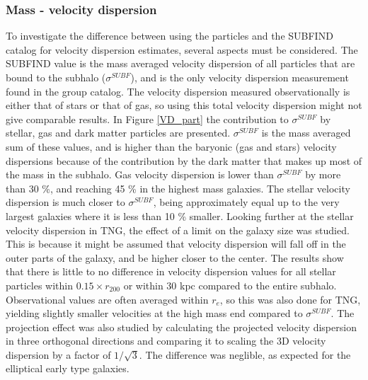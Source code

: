 \subsubsection{Mass - velocity dispersion}
To investigate the difference between using the particles and the SUBFIND catalog for velocity dispersion estimates, several aspects must be considered. The SUBFIND value is the mass averaged velocity dispersion of all particles that are bound to the subhalo ($\sigma^{SUBF}$), and is the only velocity dispersion measurement found in the group catalog. The velocity dispersion measured observationally is either that of stars or that of gas, so using this total velocity dispersion might not give comparable results. In Figure \ref{VD_part} the contribution to $\sigma^{SUBF}$ by stellar, gas and dark matter particles are presented. 
$\sigma^{SUBF}$ is the mass averaged sum of these values, and is higher than the baryonic (gas and stars) velocity dispersions because of the contribution by the dark matter that makes up most of the mass in the subhalo. Gas velocity dispersion is lower than $\sigma^{SUBF}$ by more than 30 \%, and reaching 45 \% in the highest mass galaxies. The stellar velocity dispersion is much closer to $\sigma^{SUBF}$, being approximately equal up to the very largest galaxies where it is less than 10 \% smaller. Looking further at the stellar velocity dispersion in TNG, the effect of a limit on the galaxy size was studied. This is because it might be assumed that velocity dispersion will fall off in the outer parts of the galaxy, and be higher closer to the center. The results show that there is little to no difference in velocity dispersion values for all stellar particles within $0.15 \times r_{200}$ or within 30 kpc compared to the entire subhalo. Observational values are often averaged within $r_e$, so this was also done for TNG, yielding slightly smaller velocities at the high mass end compared to $\sigma^{SUBF}$. The projection effect was also studied by calculating the projected velocity dispersion in three orthogonal directions and comparing it to scaling the 3D velocity dispersion by a factor of $1/\sqrt{3}$. The difference was neglible, as expected for the elliptical early type galaxies.

